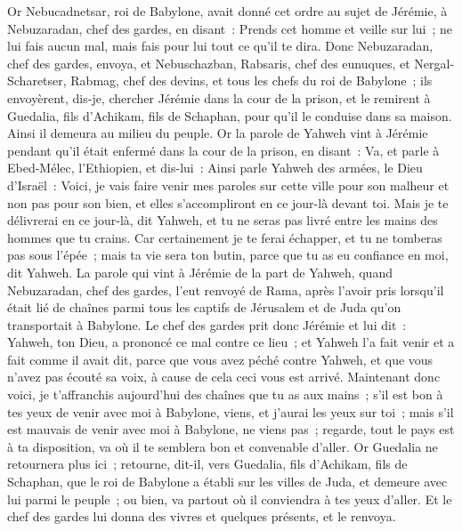 \begin{multicols}{2}
Or Nebucadnetsar, roi de Babylone, avait donné cet ordre au sujet de Jérémie, à Nebuzaradan, chef des gardes, en disant~:
Prends cet homme et veille sur lui~; ne lui fais aucun mal, mais fais pour lui tout ce qu'il te dira.
Donc Nebuzaradan, chef des gardes, envoya, et Nebuschazban, Rabsaris, chef des eunuques, et Nergal-Scharetser, Rabmag, chef des devins, et tous les chefs du roi de Babylone~;
ils envoyèrent, dis-je, chercher Jérémie dans la cour de la prison, et le remirent à Guedalia, fils d'Achikam, fils de Schaphan, pour qu'il le conduise dans sa maison. Ainsi il demeura au milieu du peuple.
Or la parole de Yahweh vint à Jérémie pendant qu'il était enfermé dans la cour de la prison, en disant~:
Va, et parle à Ebed-Mélec, l'Ethiopien, et dis-lui~: Ainsi parle Yahweh des armées, le Dieu d'Israël~: Voici, je vais faire venir mes paroles sur cette ville pour son malheur et non pas pour son bien, et elles s'accompliront en ce jour-là devant toi.
Mais je te délivrerai en ce jour-là, dit Yahweh, et tu ne seras pas livré entre les mains des hommes que tu crains.
Car certainement je te ferai échapper, et tu ne tomberas pas sous l'épée~; mais ta vie sera ton butin, parce que tu as eu confiance en moi, dit Yahweh.
\VerseOne{}La parole qui vint à Jérémie de la part de Yahweh, quand Nebuzaradan, chef des gardes, l'eut renvoyé de Rama, après l'avoir pris lorsqu'il était lié de chaînes parmi tous les captifs de Jérusalem et de Juda qu'on transportait à Babylone.
Le chef des gardes prit donc Jérémie et lui dit~: Yahweh, ton Dieu, a prononcé ce mal contre ce lieu~;
et Yahweh l'a fait venir et a fait comme il avait dit, parce que vous avez péché contre Yahweh, et que vous n'avez pas écouté sa voix, à cause de cela ceci vous est arrivé.
Maintenant donc voici, je t'affranchis aujourd'hui des chaînes que tu as aux mains~; s'il est bon à tes yeux de venir avec moi à Babylone, viens, et j'aurai les yeux sur toi~; mais s'il est mauvais de venir avec moi à Babylone, ne viens pas~; regarde, tout le pays est à ta disposition, va où il te semblera bon et convenable d'aller.
Or Guedalia ne retournera plus ici~; retourne, dit-il, vers Guedalia, fils d'Achikam, fils de Schaphan, que le roi de Babylone a établi sur les villes de Juda, et demeure avec lui parmi le peuple~; ou bien, va partout où il conviendra à tes yeux d'aller. Et le chef des gardes lui donna des vivres et quelques présents, et le renvoya.

\end{multicols}
